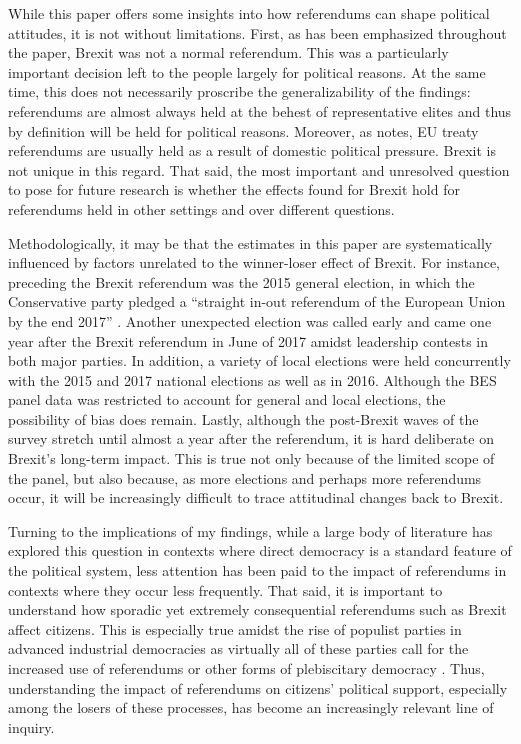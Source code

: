 \documentclass[12pt, letter]{article}
\begin{document}
While this paper offers some insights into how referendums can shape political attitudes, it is not without limitations. First, as has been emphasized throughout the paper, Brexit was not a normal referendum. This was a particularly important decision left to the people largely for political reasons. At the same time, this does not necessarily proscribe the generalizability of the findings: referendums are almost always held at the behest of representative elites and thus by definition will be held for political reasons. Moreover, as \textcite{prosser2016calling} notes, EU treaty referendums are usually held as a result of domestic political pressure. Brexit is not unique in this regard. That said, the most important and unresolved question to pose for future research is whether the effects found for Brexit hold for referendums held in other settings and over different questions.

Methodologically, it may be that the estimates in this paper are systematically influenced by factors unrelated to the winner-loser effect of Brexit. For instance, preceding the Brexit referendum was the 2015 general election, in which the Conservative party pledged a ``straight in-out referendum of the European Union by the end 2017'' \parencite{conservative2015manifesto}. Another unexpected election was called early and came one year after the Brexit referendum in June of 2017 amidst leadership contests in both major parties. In addition, a variety of local elections were held concurrently with the 2015 and 2017 national elections as well as in 2016. Although the BES panel data was restricted to account for general and local elections, the possibility of bias does remain. Lastly, although the post-Brexit waves of the survey stretch until almost a year after the referendum, it is hard deliberate on Brexit's long-term impact. This is true not only because of the limited scope of the panel, but also because, as more elections and perhaps more referendums occur, it will be increasingly difficult to trace attitudinal changes back to Brexit. 

Turning to the implications of my findings, while a large body of literature has explored this question in contexts where direct democracy is a standard feature of the political system, less attention has been paid to the impact of referendums in contexts where they occur less frequently. That said, it is important to understand how sporadic yet extremely consequential referendums such as Brexit affect citizens. This is especially true amidst the rise of populist parties in advanced industrial democracies as virtually all of these parties call for the increased use of referendums or other forms of plebiscitary democracy \parencite{mudde2007populist}. Thus, understanding the impact of referendums on citizens' political support, especially among the losers of these processes, has become an increasingly relevant line of inquiry.  
\end{document}
